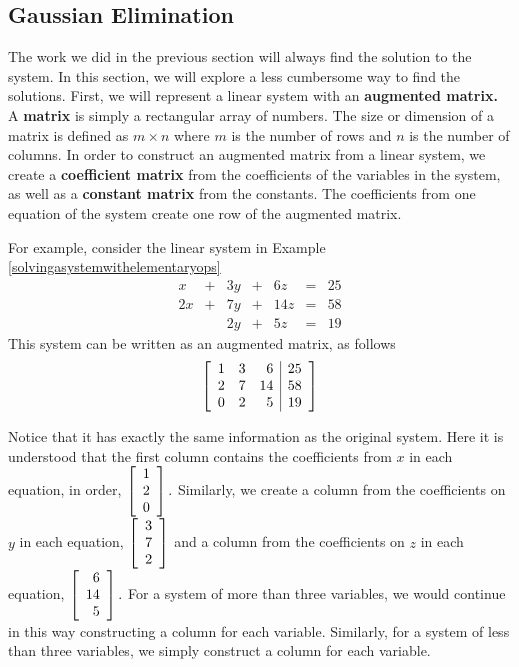 \subsection{Gaussian Elimination}

The work we did in the previous section will always find the solution to the system. In this section, we will explore a less cumbersome way to 
find the solutions. First, we will represent a linear system with an \textbf{augmented matrix.} 
A \textbf{matrix}  is simply a rectangular array of numbers. The size or dimension of a matrix  is defined as $m\times n$ where $m$ is the
number of rows and $n$ is the number of columns. In order to construct an augmented matrix
from a linear system, we create a \textbf{coefficient matrix} from the coefficients of the variables in the system, as well as a
\textbf{constant matrix} from the constants. The coefficients from one equation of the system create one row of the augmented matrix. 

For example, consider the linear system in Example \ref{solvingasystemwithelementaryops}
\begin{equation*}
\begin{array}{ccccccc}
x&+&3y&+&6z&=&25 \\
2x&+&7y&+&14z&=&58 \\
&&2y&+&5z&=&19
\end{array}
\end{equation*}
This system can be written as an augmented matrix, as follows \:
\begin{equation*}
\left[ 
\begin{array}{rrr|r}
1 & 3 & 6 & 25 \\
2 & 7 & 14 & 58 \\
0 & 2 & 5 & 19
\end{array}
\right] 
\end{equation*}

Notice that it has exactly the same information as the original system. Here it is
understood that the first column contains the coefficients from $x$ in each equation, in order,   
$\left[
\begin{array}{r}
1 \\
2 \\
0
\end{array}
\right] .$ Similarly, we create a column from the coefficients on $y$ in each equation, $\left[
\begin{array}{r}
3 \\
7 \\
2
\end{array}
\right] $ and a column from the coefficients on $z$ in each equation, $\left[
\begin{array}{r}
6 \\
14 \\
5
\end{array}
\right] .$ For a system of more than three variables, we would continue in this way constructing a column for each variable.
Similarly, for a system of less than three variables, we simply construct a column for each variable. 

